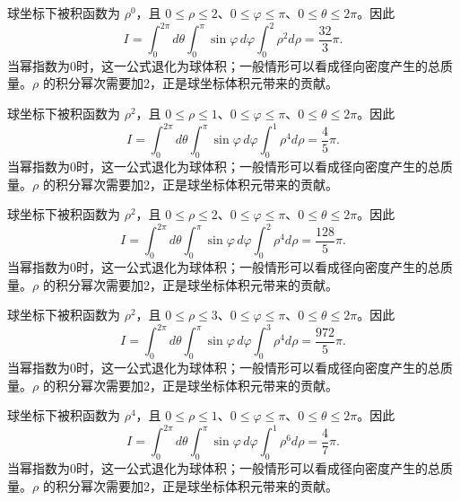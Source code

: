 \documentclass[UTF8,12pt,a4paper,fontset=fandol]{ctexart}
\begin{document}
\begin{solve}\label{ans:c38q14}
球坐标下被积函数为 $\rho^{0}$，且 $0\le\rho\le 2$、$0\le\varphi\le\pi$、$0\le\theta\le2\pi$。因此
\[
I=\int_0^{2\pi}d\theta\int_0^\pi\sin\varphi\,d\varphi\int_0^{2}\rho^{2}d\rho=\frac{32}{3}\pi.
\]
当幂指数为0时，这一公式退化为球体积；一般情形可以看成径向密度产生的总质量。$\rho$ 的积分幂次需要加2，正是球坐标体积元带来的贡献。
\end{solve}

\begin{solve}\label{ans:c38q15}
球坐标下被积函数为 $\rho^{2}$，且 $0\le\rho\le 1$、$0\le\varphi\le\pi$、$0\le\theta\le2\pi$。因此
\[
I=\int_0^{2\pi}d\theta\int_0^\pi\sin\varphi\,d\varphi\int_0^{1}\rho^{4}d\rho=\frac{4}{5}\pi.
\]
当幂指数为0时，这一公式退化为球体积；一般情形可以看成径向密度产生的总质量。$\rho$ 的积分幂次需要加2，正是球坐标体积元带来的贡献。
\end{solve}

\begin{solve}\label{ans:c38q16}
球坐标下被积函数为 $\rho^{2}$，且 $0\le\rho\le 2$、$0\le\varphi\le\pi$、$0\le\theta\le2\pi$。因此
\[
I=\int_0^{2\pi}d\theta\int_0^\pi\sin\varphi\,d\varphi\int_0^{2}\rho^{4}d\rho=\frac{128}{5}\pi.
\]
当幂指数为0时，这一公式退化为球体积；一般情形可以看成径向密度产生的总质量。$\rho$ 的积分幂次需要加2，正是球坐标体积元带来的贡献。
\end{solve}

\begin{solve}\label{ans:c38q17}
球坐标下被积函数为 $\rho^{2}$，且 $0\le\rho\le 3$、$0\le\varphi\le\pi$、$0\le\theta\le2\pi$。因此
\[
I=\int_0^{2\pi}d\theta\int_0^\pi\sin\varphi\,d\varphi\int_0^{3}\rho^{4}d\rho=\frac{972}{5}\pi.
\]
当幂指数为0时，这一公式退化为球体积；一般情形可以看成径向密度产生的总质量。$\rho$ 的积分幂次需要加2，正是球坐标体积元带来的贡献。
\end{solve}

\begin{solve}\label{ans:c38q18}
球坐标下被积函数为 $\rho^{4}$，且 $0\le\rho\le 1$、$0\le\varphi\le\pi$、$0\le\theta\le2\pi$。因此
\[
I=\int_0^{2\pi}d\theta\int_0^\pi\sin\varphi\,d\varphi\int_0^{1}\rho^{6}d\rho=\frac{4}{7}\pi.
\]
当幂指数为0时，这一公式退化为球体积；一般情形可以看成径向密度产生的总质量。$\rho$ 的积分幂次需要加2，正是球坐标体积元带来的贡献。
\end{solve}
\end{document}
